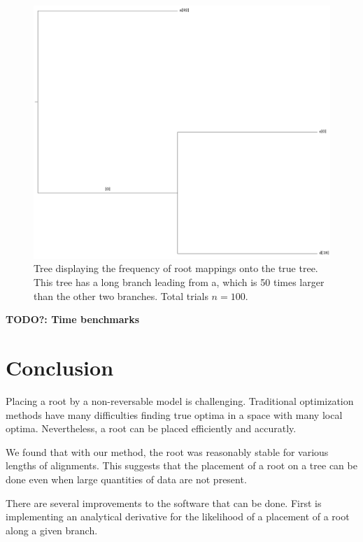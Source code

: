 \documentclass{article}
\begin{document}
\begin{figure}
  \includegraphics[width=.9\linewidth]{figs/lba_tree2.png}
  \caption{Tree displaying the frequency of root mappings onto the true tree.
  This tree has a long branch leading from a, which is 50 times larger than the
  other two branches. Total trials $n=100$.}
  \label{fig:lba_tree}
\end{figure}

\textbf{TODO?: Time benchmarks}


\section{Conclusion}

Placing a root by a non-reversable model is challenging. Traditional
optimization methods have many difficulties finding true optima in a space with
many local optima. Nevertheless, a root can be placed efficiently and accuratly.

We found that with our method, the root was reasonably stable for various
lengths of alignments. This suggests that the placement of a root on a tree can
be done even when large quantities of data are not present.

There are several improvements to the software that can be done. First is
implementing an analytical derivative for the likelihood of a placement of a
root along a given branch.



\end{document}

